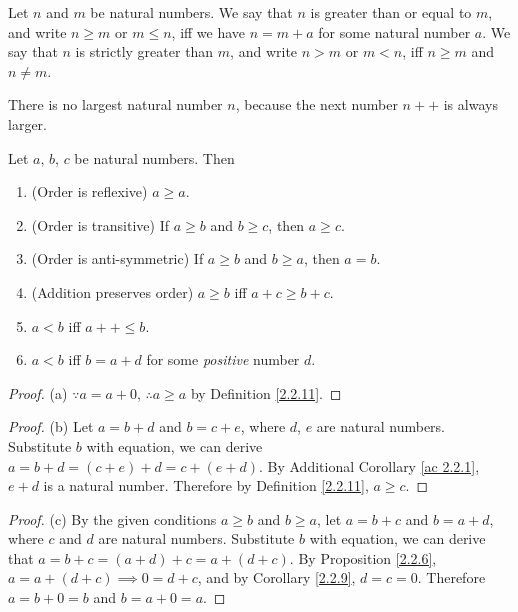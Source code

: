 \begin{definition}\label{2.2.11}
Let \(n\) and \(m\) be natural numbers.
We say that \(n\) is greater than or equal to \(m\), and write \(n \geq m\) or \(m \leq n\), iff we have \(n = m + a\) for some natural number \(a\).
We say that \(n\) is strictly greater than \(m\), and write \(n > m\) or \(m < n\), iff \(n \geq m\) and \(n \neq m\).
\end{definition}

\begin{note}
There is no largest natural number \(n\), because the next number \(n++\) is always larger.
\end{note}

\begin{proposition}\label{2.2.12}
Let \(a\), \(b\), \(c\) be natural numbers.
Then
\begin{enumerate}
\item (Order is reflexive) \(a \geq a\).
\item (Order is transitive) If \(a \geq b\) and \(b \geq c\), then \(a \geq c\).
\item (Order is anti-symmetric) If \(a \geq b\) and \(b \geq a\), then \(a = b\).
\item (Addition preserves order) \(a \geq b\) iff \(a + c \geq b + c\).
\item \(a < b\) iff \(a++ \leq b\).
\item \(a < b\) iff \(b = a + d\) for some \emph{positive} number \(d\).
\end{enumerate}
\end{proposition}

\begin{proof}{(a)}
\(\because a = a + 0\), \(\therefore a \geq a\) by Definition \ref{2.2.11}.
\end{proof}

\begin{proof}{(b)}
Let \(a = b + d\) and \(b = c + e\), where \(d\), \(e\) are natural numbers.
Substitute \(b\) with equation, we can derive \(a = b + d = (c + e) + d = c + (e + d)\).
By Additional Corollary \ref{ac 2.2.1}, \(e + d\) is a natural number.
Therefore by Definition \ref{2.2.11}, \(a \geq c\).
\end{proof}

\begin{proof}{(c)}
By the given conditions \(a \geq b\) and \(b \geq a\), let \(a = b + c\) and \(b = a + d\), where \(c\) and \(d\) are natural numbers.
Substitute \(b\) with equation, we can derive that \(a = b + c = (a + d) + c = a + (d + c)\).
By Proposition \ref{2.2.6}, \(a = a + (d + c) \implies 0 = d + c\), and by Corollary \ref{2.2.9}, \(d = c = 0\).
Therefore \(a = b + 0 = b\) and \(b = a + 0 = a\).
\end{proof}

